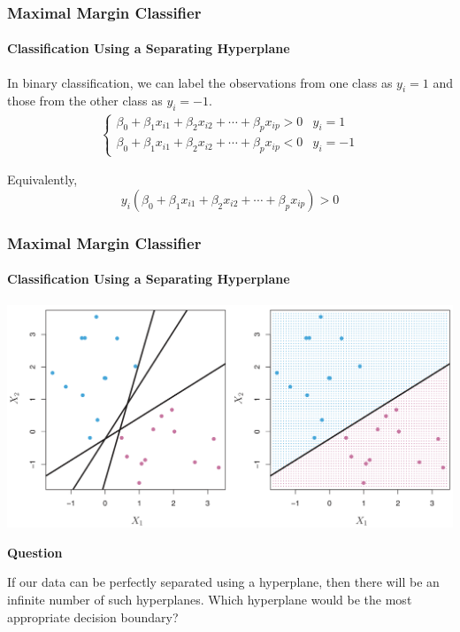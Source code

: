 \documentclass{beamer}
\begin{document}
\begin{frame}
    \frametitle{Maximal Margin Classifier}
    \framesubtitle{Classification Using a Separating Hyperplane}
    In binary classification, we can label the observations from one class as $y_i=1$ 
    and those from the other class as $y_i=-1$.
    \begin{align*}
        \begin{cases}
            \beta_0+\beta_1x_{i1}+\beta_2x_{i2}+\cdots+\beta_px_{ip}>0 & y_i=1 \\
            \beta_0+\beta_1x_{i1}+\beta_2x_{i2}+\cdots+\beta_px_{ip}<0 & y_i=-1
        \end{cases}
\end{align*}

Equivalently,
\[y_i(\beta_0+\beta_1x_{i1}+\beta_2x_{i2}+\cdots+\beta_px_{ip})>0 \] 
\end{frame}





\begin{frame}
    \frametitle{Maximal Margin Classifier}
    \framesubtitle{Classification Using a Separating Hyperplane}

    \begin{center}
        \includegraphics[scale=0.2]{images/hyperplane.png}
    \end{center}

    \textbf{Question}

    If our data can be perfectly separated using a hyperplane, then there will 
    be an infinite number of such hyperplanes. Which hyperplane would be the most 
    appropriate decision boundary?
\end{frame}
\end{document}
